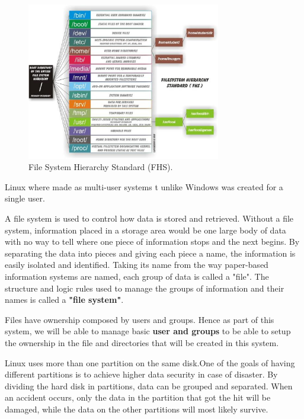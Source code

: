 \documentclass{aes2e}
\begin{document}
\begin{figure}[ht]
\centering
\includegraphics[width=20pc]{hN4lt.eps}
\caption{File System Hierarchy Standard (FHS).}
\end{figure}

Linux where made as multi-user systems t unlike Windows was created for a single user.\newline

A file system is used to control how data is stored and retrieved. Without a file system, information placed in a storage area would be one large body of data with no way to tell where one piece of information stops and the next begins. By separating the data into pieces and giving each piece a name, the information is easily isolated and identified. Taking its name from the way paper-based information systems are named, each group of data is called a "file". The structure and logic rules used to manage the groups of information and their names is called a \textbf{"file system"}.\cite{DEK2}\newline

Files have ownership composed by users and groups. Hence as part of this system, we will be able to manage basic \textbf{user and groups} to be able to setup the ownership in the file and directories that will be created in this system.\cite{DEK3}\newline

Linux uses more than one partition on the same disk.One of the goals of having different partitions is to achieve higher data security in case of disaster. By dividing the hard disk in partitions, data can be grouped and separated. When an accident occurs, only the data in the partition that got the hit will be damaged, while the data on the other partitions will most likely survive.\cite{DEK1} \newline
\end{document}
